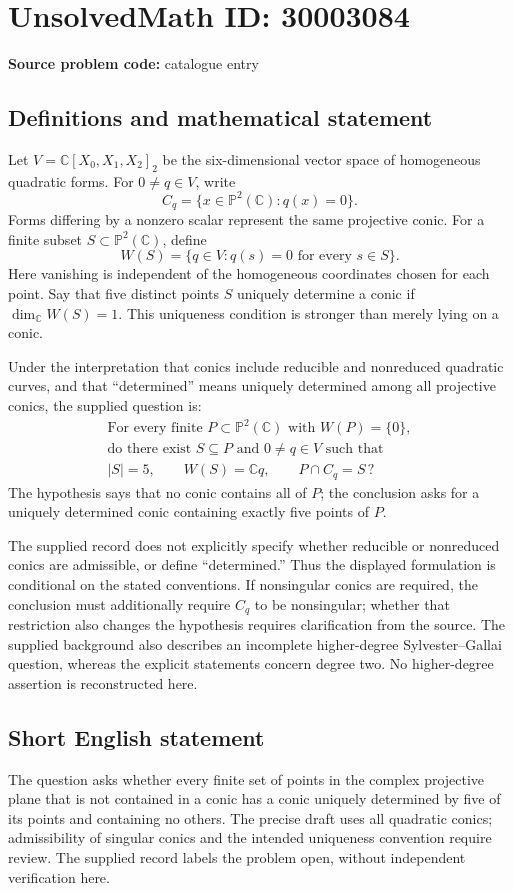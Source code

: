 \documentclass[11pt]{article}
\newcommand{\C}{\mathbb{C}}
\newcommand{\PP}{\mathbb{P}}
\begin{document}
\section*{UnsolvedMath ID: 30003084}
\textbf{Source problem code:} catalogue entry
\subsection{Definitions and mathematical statement}
Let \(V=\C[X_0,X_1,X_2]_2\) be the six-dimensional vector space of homogeneous quadratic forms. For \(0\ne q\in V\), write
\[
C_q=\{x\in\PP^2(\C):q(x)=0\}.
\]
Forms differing by a nonzero scalar represent the same projective conic. For a finite subset \(S\subset\PP^2(\C)\), define
\[
W(S)=\{q\in V:q(s)=0\text{ for every }s\in S\}.
\]
Here vanishing is independent of the homogeneous coordinates chosen for each point. Say that five distinct points \(S\) uniquely determine a conic if \(\dim_{\C}W(S)=1\). This uniqueness condition is stronger than merely lying on a conic.

Under the interpretation that conics include reducible and nonreduced quadratic curves, and that ``determined'' means uniquely determined among all projective conics, the supplied question is:
\[
\begin{gathered}
\text{For every finite }P\subset\PP^2(\C)\text{ with }W(P)=\{0\},\\
\text{do there exist }S\subseteq P\text{ and }0\ne q\in V\text{ such that}\\
|S|=5,\qquad W(S)=\C q,\qquad P\cap C_q=S\,?
\end{gathered}
\]
The hypothesis says that no conic contains all of \(P\); the conclusion asks for a uniquely determined conic containing exactly five points of \(P\).

The supplied record does not explicitly specify whether reducible or nonreduced conics are admissible, or define ``determined.'' Thus the displayed formulation is conditional on the stated conventions. If nonsingular conics are required, the conclusion must additionally require \(C_q\) to be nonsingular; whether that restriction also changes the hypothesis requires clarification from the source. The supplied background also describes an incomplete higher-degree Sylvester--Gallai question, whereas the explicit statements concern degree two. No higher-degree assertion is reconstructed here.
\subsection{Short English statement}
The question asks whether every finite set of points in the complex projective plane that is not contained in a conic has a conic uniquely determined by five of its points and containing no others. The precise draft uses all quadratic conics; admissibility of singular conics and the intended uniqueness convention require review. The supplied record labels the problem open, without independent verification here.
\end{document}

